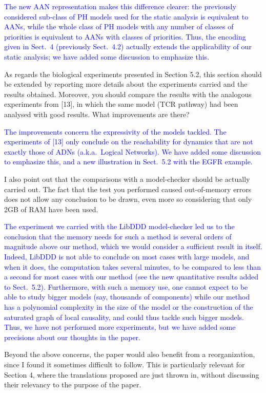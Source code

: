 \documentclass[11pt]{article}
\newcommand{\answer}[1]{\textcolor{blue}{#1}\vspace*{1em}}
\begin{document}
\answer{
The new AAN representation makes this difference clearer:
the previously considered sub-class of PH models used for the static analysis
is equivalent to AANs,
while the whole class of PH models with any number of classes of priorities
is equivalent to AANs with classes of priorities.
Thus, the encoding given in Sect.~4 (previously Sect.~4.2)
actually extends the applicability
of our static analysis; we have added some discussion to emphasize this.
}

As regards the biological experiments presented in Section 5.2, this section should be extended by reporting more details about the experiments carried and the results obtained. Moreover, you should compare the results with the analogous experiments from [13], in which the same model (TCR pathway) had been analysed with good results. What improvements are there?

\answer{
The improvements concern the expressivity of the models tackled.
The experiments of [13] only conclude on the reachability for dynamics
that are not exactly those of ADNs (a.k.a.~Logical Networks).
We have added some discussion to emphasize this,
and a new illustration in Sect.~5.2 with the EGFR example.
}

I also point out that the comparisons with a model-checker should be actually carried out. The fact that the test you performed caused out-of-memory errors does not allow any conclusion to be drawn, even more so considering that only 2GB of RAM have been used.

\answer{
The experiment we carried with the LibDDD model-checker led us to the conclusion that the memory needs for such a method is several orders of magnitude above our method, which we would consider a sufficient result in itself.
Indeed, LibDDD is not able to conclude on most cases with large models,
and when it does, the computation takes several minutes,
to be compared to less than a second for most cases with our method
(see the new quantitative results added to Sect.~5.2).
Furthermore, with such a memory use, one cannot expect to be able to study bigger models (say, thousands of components) while our method has a polynomial complexity in the size of the model or the construction of the saturated graph of local causality, and could thus tackle such bigger models.
Thus, we have not performed more experiments,
but we have added some precisions about our thoughts in the paper.
}

Beyond the above concerns, the paper would also benefit from a reorganization, since I found it sometimes difficult to follow. This is particularly relevant for Section 4, where the translations proposed are just thrown in, without discussing their relevancy to the purpose of the paper.
\end{document}
